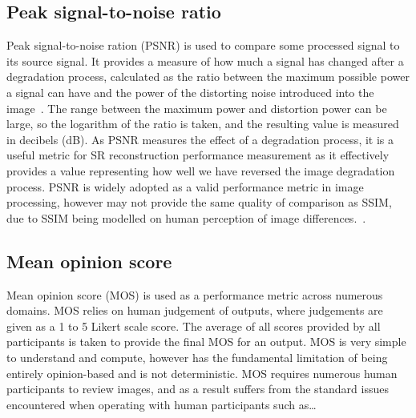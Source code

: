 \subsection{Peak signal-to-noise ratio}
Peak signal-to-noise ration (PSNR) is used to compare some processed signal to its source signal. It provides a measure of how much a signal has changed after a degradation process, calculated as the ratio between the maximum possible power a signal can have and the power of the distorting noise introduced into the image~\cite{psnr}. The range between the maximum power and distortion power can be large, so the logarithm of the ratio is taken, and the resulting value is measured in decibels (dB). As PSNR measures the effect of a degradation process, it is a useful metric for SR reconstruction performance measurement as it effectively provides a value representing how well we have reversed the image degradation process. PSNR is widely adopted as a valid performance metric in image processing, however may not provide the same quality of comparison as SSIM, due to SSIM being modelled on human perception of image differences.~\cite{psnrAnalysis}.

\subsection{Mean opinion score}
Mean opinion score (MOS) is used as a performance metric across numerous domains. MOS relies on human judgement of outputs, where judgements are given as a 1 to 5 Likert scale score. The average of all scores provided by all participants is taken to provide the final MOS for an output. MOS is very simple to understand and compute, however has the fundamental limitation of being entirely opinion-based and is not deterministic. MOS requires numerous human participants to review images, and as a result suffers from the standard issues encountered when operating with human participants such as\dots